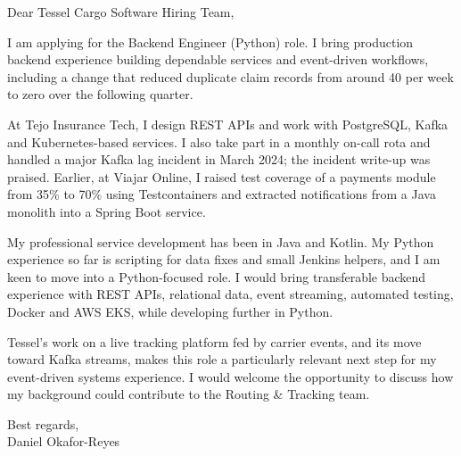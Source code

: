 \documentclass[11pt,a4paper]{article}
\begin{document}
\noindent Dear Tessel Cargo Software Hiring Team,

\vspace{1em}

I am applying for the Backend Engineer (Python) role. I bring production backend experience building dependable services and event-driven workflows, including a change that reduced duplicate claim records from around 40 per week to zero over the following quarter.

\vspace{0.8em}

At Tejo Insurance Tech, I design REST APIs and work with PostgreSQL, Kafka and Kubernetes-based services. I also take part in a monthly on-call rota and handled a major Kafka lag incident in March 2024; the incident write-up was praised. Earlier, at Viajar Online, I raised test coverage of a payments module from 35\% to 70\% using Testcontainers and extracted notifications from a Java monolith into a Spring Boot service.

\vspace{0.8em}

My professional service development has been in Java and Kotlin. My Python experience so far is scripting for data fixes and small Jenkins helpers, and I am keen to move into a Python-focused role. I would bring transferable backend experience with REST APIs, relational data, event streaming, automated testing, Docker and AWS EKS, while developing further in Python.

\vspace{0.8em}

Tessel's work on a live tracking platform fed by carrier events, and its move toward Kafka streams, makes this role a particularly relevant next step for my event-driven systems experience. I would welcome the opportunity to discuss how my background could contribute to the Routing & Tracking team.

\vspace{1em}

Best regards,\\
Daniel Okafor-Reyes
\end{document}
